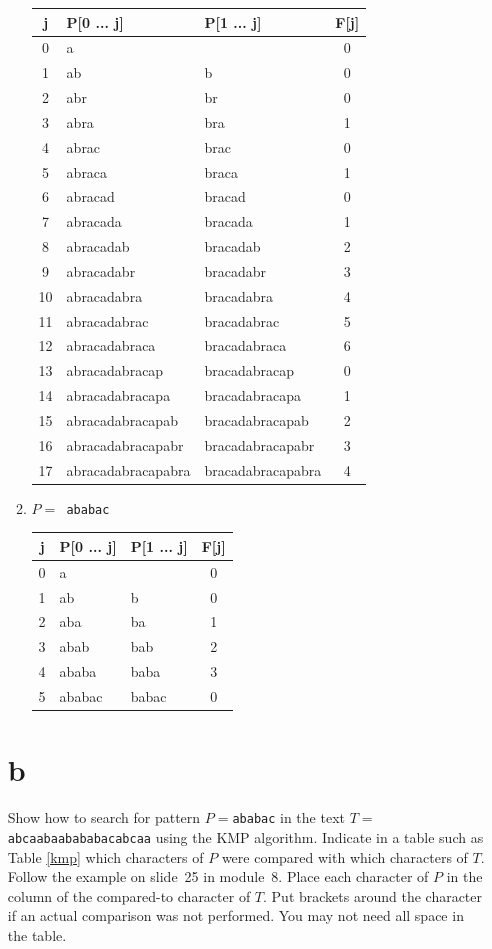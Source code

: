 \documentclass[12pt]{article}
\begin{document}
\begin{itemize}
\begin{enumerate}
\begin{center}
  \begin{tabular}{c|l|l|c}
    \hline
    \textbf{j} & \textbf{P[0 ... j]} & \textbf{P[1 ... j]} & \textbf{F[j]}\\
    \hline
    0 & a &  & 0\\
    1 & ab & b & 0\\
    2 & abr & br & 0\\
    3 & abra & bra & 1\\
    4 & abrac & brac & 0\\
    5 & abraca & braca & 1\\
    6 & abracad & bracad & 0\\
    7 & abracada & bracada & 1\\
    8 & abracadab & bracadab & 2\\
    9 & abracadabr & bracadabr & 3\\
    10 & abracadabra & bracadabra & 4\\
    11 & abracadabrac & bracadabrac & 5\\
    12 & abracadabraca & bracadabraca & 6\\
    13 & abracadabracap & bracadabracap & 0\\
    14 & abracadabracapa & bracadabracapa & 1\\
    15 & abracadabracapab & bracadabracapab & 2\\
    16 & abracadabracapabr & bracadabracapabr & 3\\
    17 & abracadabracapabra & bracadabracapabra & 4
  \end{tabular}
\end{center}
\item $P = ${\tt~ababac}
\begin{center}
  \begin{tabular}{c|l|l|c}
    \hline
    \textbf{j} & \textbf{P[0 ... j]} & \textbf{P[1 ... j]} & \textbf{F[j]}\\
    \hline
    0 & a &  & 0\\
    1 & ab & b & 0\\
    2 & aba & ba & 1\\
    3 & abab & bab & 2\\
    4 & ababa & baba & 3\\
    5 & ababac & babac & 0
  \end{tabular}
\end{center}
\end{enumerate}
\part{b}
Show how to search for pattern $P=$\texttt{ababac} in the text $T=$\texttt{abcaabaabababacabcaa} using the KMP algorithm. Indicate in a table such as Table \ref{kmp} which characters of $P$ were compared with which characters of $T$. Follow the example on slide~25 in module~8. Place each character of $P$ in the column of the compared-to character of $T$.  Put brackets around the character if an actual comparison was not performed. You may not need all space in the table.
\end{itemize}
\end{document}
